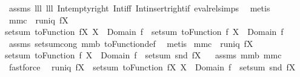 \begin{isabellebody}
%
\isadelimproof
%
\endisadelimproof
%
\isatagproof
{}\isamarkupfalse%
\ assms\ lll{}{}\ lll{}{}\ Int{\isacharunderscore}empty{\isacharunderscore}right\ Int{\isacharunderscore}iff\ Int{\isacharunderscore}insert{\isacharunderscore}right{\isacharunderscore}if{}\ eval{\isacharunderscore}rel{\isachardot}simps\ \isamarkupfalse%
\ metis%
\endisatagproof
{\isafoldproof}%
%
\isadelimproof
\isanewline
%
\endisadelimproof
\isanewline
{}\isamarkupfalse%
\ mm{}{}c{\isacharcolon}\ \ {\isachardoublequoteopen}runiq\ {\isacharparenleft}f{\isacharbar}{\isacharbar}X{\isacharparenright}{\isachardoublequoteclose}\ \ \isanewline
{\isachardoublequoteopen}setsum\ {\isacharparenleft}toFunction\ {\isacharparenleft}f{\isacharbar}{\isacharbar}X{\isacharparenright}{\isacharparenright}\ {\isacharparenleft}X\ {\isasyminter}\ Domain\ f{\isacharparenright}\ {\isacharequal}\ setsum\ {\isacharparenleft}toFunction\ f{\isacharparenright}\ {\isacharparenleft}X\ {\isasyminter}\ Domain\ f{\isacharparenright}{\isachardoublequoteclose}\ \isanewline
%
\isadelimproof
%
\endisadelimproof
%
\isatagproof
{}\isamarkupfalse%
\ assms\ setsum{\isachardot}cong\ mm{}{}b\ toFunction{\isacharunderscore}def\ \isamarkupfalse%
\ metis%
\endisatagproof
{\isafoldproof}%
%
\isadelimproof
\isanewline
%
\endisadelimproof
{}\isamarkupfalse%
\ mm{}{}c{\isacharcolon}\ \ {\isachardoublequoteopen}runiq\ {\isacharparenleft}f{\isacharbar}{\isacharbar}X{\isacharparenright}{\isachardoublequoteclose}\ \ \isanewline
{\isachardoublequoteopen}setsum\ {\isacharparenleft}toFunction\ f{\isacharparenright}\ {\isacharparenleft}X\ {\isasyminter}\ Domain\ f{\isacharparenright}\ {\isacharequal}\ setsum\ snd\ {\isacharparenleft}f{\isacharbar}{\isacharbar}X{\isacharparenright}{\isachardoublequoteclose}%
\isadelimproof
\ %
\endisadelimproof
%
\isatagproof
{}\isamarkupfalse%
\ assms\ mm{}{}b\ mm{}{}c\ \isamarkupfalse%
\ fastforce%
\endisatagproof
{\isafoldproof}%
%
\isadelimproof
%
\endisadelimproof
\isanewline
\isanewline
{}\isamarkupfalse%
\ \ {\isachardoublequoteopen}runiq\ {\isacharparenleft}f{\isacharbar}{\isacharbar}X{\isacharparenright}{\isachardoublequoteclose}\ \ {\isachardoublequoteopen}setsum\ {\isacharparenleft}toFunction\ {\isacharparenleft}f{\isacharbar}{\isacharbar}X{\isacharparenright}{\isacharparenright}\ {\isacharparenleft}X\ {\isasyminter}\ Domain\ f{\isacharparenright}\ {\isacharequal}\ setsum\ snd\ {\isacharparenleft}f{\isacharbar}{\isacharbar}X{\isacharparenright}{\isachardoublequoteclose}\ \isanewline

\end{isabellebody}
